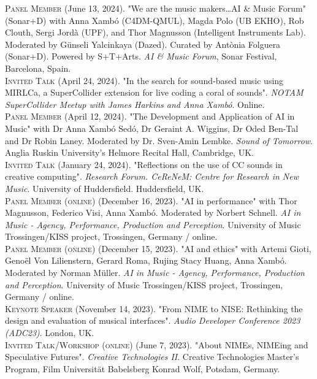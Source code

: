 \documentclass[10pt, a4paper]{article}
\newcommand{\years}[1]{\marginnote{\scriptsize #1}}
\begin{document}
{\years{2024d} \textsc{Panel Member} (June 13, 2024). "We are the music makers\dots AI \& Music Forum" (Sonar+D) with Anna Xambó (C4DM-QMUL), Magda Polo (UB EKHO), Rob Clouth, Sergi Jordà (UPF), and Thor Magnusson (Intelligent Instruments Lab). Moderated by Günseli Yalcinkaya (Dazed). Curated by Antònia Folguera (Sonar+D). Powered by S+T+Arts.  \emph{AI \& Music Forum}, Sonar Festival, Barcelona, Spain.\\ 
\years{2024c} \textsc{Invited Talk} (April 24, 2024). "In the search for sound-based music using MIRLCa, a SuperCollider extension for live coding a coral of sounds". \emph{NOTAM SuperCollider Meetup with James Harkins and Anna Xambó}. Online.\\ 
\years{2024b} \textsc{Panel Member} (April 12, 2024). "The Development and Application of AI in Music" with Dr Anna Xambó Sedó, Dr Geraint A. Wiggins, Dr Oded Ben-Tal and Dr Robin Laney. Moderated by Dr. Sven-Amin Lembke. \emph{Sound of Tomorrow}.  Anglia Ruskin University's Helmore Recital Hall, Cambridge, UK.\\ 
\years{2024a} \textsc{Invited Talk} (January 24, 2024). "Reflections on the use of CC sounds in creative computing". \emph{Research Forum. CeReNeM: Centre for Research in New Music}. University of Huddersfield. Huddersfield, UK.\\ 
\years{2023e} \textsc{Panel Member (online)} (December 16, 2023). "AI in performance" with Thor Magnusson, Federico Visi, Anna Xambó. Moderated by Norbert Schnell. \emph{AI in Music - Agency, Performance, Production and Perception}.  University of Music Trossingen/KISS project, Trossingen, Germany / online.\\ 
\years{2023d} \textsc{Panel Member (online)} (December 15, 2023). "AI and ethics" with Artemi Gioti, Genoël Von Lilienstern, Gerard Roma, Rujing Stacy Huang, Anna Xambó. Moderated by Norman Müller. \emph{AI in Music - Agency, Performance, Production and Perception}.  University of Music Trossingen/KISS project, Trossingen, Germany / online.\\ 
\years{2023c} \textsc{Keynote Speaker} (November 14, 2023). "From NIME to NISE: Rethinking the design and evaluation of musical interfaces". \emph{Audio Developer Conference 2023 (ADC23)}. London, UK.\\ 
\years{2023b} \textsc{Invited Talk/Workshop (online)} (June 7, 2023). "About NIMEs, NIMEing and Speculative Futures". \emph{Creative Technologies II}. Creative Technologies Master's Program, Film Universität Babelsberg Konrad Wolf, Potsdam, Germany.\\ 
}
\end{document}

